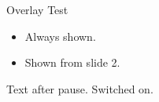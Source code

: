 \begin{frame}{Overlay Test}
  \begin{itemize}
    \item<1-> Always shown.
    \item<2-> Shown from slide 2.
  \end{itemize}
  \pause
  Text after pause.
  Switched on.
\end{frame}
